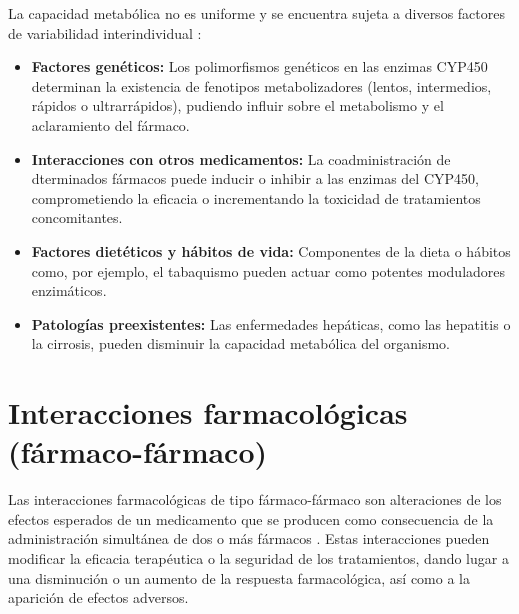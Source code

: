 La capacidad metabólica no es uniforme y se encuentra sujeta a diversos factores de variabilidad interindividual \cite{lee2024review} \cite{sefh_medicamentos}:
\begin{itemize}
    \item \textbf{Factores genéticos:} Los polimorfismos genéticos en las enzimas CYP450 determinan la existencia de fenotipos metabolizadores (lentos, intermedios, rápidos o ultrarrápidos), pudiendo influir sobre el metabolismo y el aclaramiento del fármaco.
    \item \textbf{Interacciones con otros medicamentos:} La coadministración de dterminados fármacos puede inducir o inhibir a las enzimas del CYP450, comprometiendo la eficacia o incrementando la toxicidad de tratamientos concomitantes.
    \item \textbf{Factores dietéticos y hábitos de vida:} Componentes de la dieta o hábitos como, por ejemplo, el tabaquismo pueden actuar como potentes moduladores enzimáticos.
    \item \textbf{Patologías preexistentes:} Las enfermedades hepáticas, como las hepatitis o la cirrosis, pueden disminuir la capacidad metabólica del organismo.
\end{itemize}


\section{Interacciones farmacológicas (fármaco-fármaco)}
Las interacciones farmacológicas de tipo fármaco-fármaco son alteraciones de los efectos esperados de un medicamento que se producen como 
consecuencia de la administración simultánea de dos o más fármacos \cite{manual_msd_interacciones}. Estas interacciones pueden modificar la eficacia terapéutica o la 
seguridad de los tratamientos, dando lugar a una disminución o un aumento de la respuesta farmacológica, así como a la aparición de 
efectos adversos.

